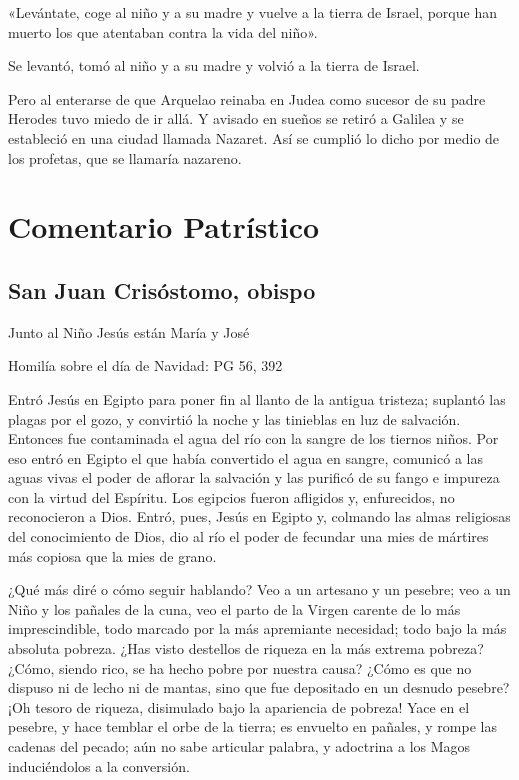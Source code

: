 «Levántate, coge al niño y a su madre y vuelve a la tierra de Israel,
porque han muerto los que atentaban contra la vida del niño».

Se levantó, tomó al niño y a su madre y volvió a la tierra de Israel.

Pero al enterarse de que Arquelao reinaba en Judea como sucesor de su
padre Herodes tuvo miedo de ir allá. Y avisado en sueños se retiró a
Galilea y se estableció en una ciudad llamada Nazaret. Así se cumplió lo
dicho por medio de los profetas, que se llamaría nazareno.


\section{Comentario Patrístico}

\subsection{San Juan Crisóstomo, obispo}

Junto al Niño Jesús están María y José

Homilía sobre el día de Navidad: PG 56, 392

Entró Jesús en Egipto para poner fin al llanto de la antigua tristeza; suplantó las plagas por el gozo, y convirtió la noche y las tinieblas en luz de salvación. Entonces fue contaminada el agua del río con la sangre de los tiernos niños. Por eso entró en Egipto el que había convertido el agua en sangre, comunicó a las aguas vivas el poder de aflorar la salvación y las purificó de su fango e impureza con la virtud del Espíritu. Los egipcios fueron afligidos y, enfurecidos, no reconocieron a Dios. Entró, pues, Jesús en Egipto y, colmando las almas religiosas del conocimiento de Dios, dio al río el poder de fecundar una mies de mártires más copiosa que la mies de grano.

¿Qué más diré o cómo seguir hablando? Veo a un artesano y un pesebre; veo a un Niño y los pañales de la cuna, veo el parto de la Virgen carente de lo más imprescindible, todo marcado por la más apremiante necesidad; todo bajo la más absoluta pobreza. ¿Has visto destellos de riqueza en la más extrema pobreza? ¿Cómo, siendo rico, se ha hecho pobre por nuestra causa? ¿Cómo es que no dispuso ni de lecho ni de mantas, sino que fue depositado en un desnudo pesebre? ¡Oh tesoro de riqueza, disimulado bajo la apariencia de pobreza! Yace en el pesebre, y hace temblar el orbe de la tierra; es envuelto en pañales, y rompe las cadenas del pecado; aún no sabe articular palabra, y adoctrina a los Magos induciéndolos a la conversión.

